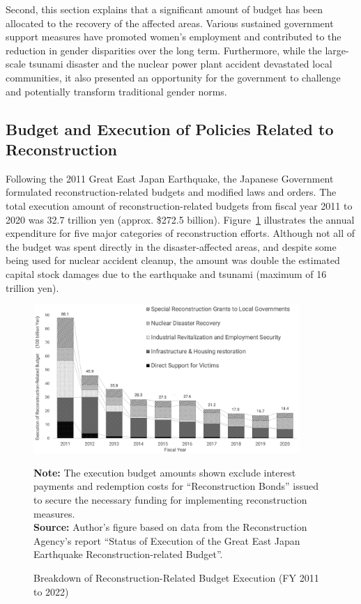 \documentclass[a4paper,12pt]{article}
\begin{document}
Second, this section explains that a significant amount of budget has been allocated to the recovery of the affected areas. Various sustained government support measures have promoted women's employment and contributed to the reduction in gender disparities over the long term. Furthermore, while the large-scale tsunami disaster and the nuclear power plant accident devastated local communities, it also presented an opportunity for the government to challenge and potentially transform traditional gender norms.


\subsection{Budget and Execution of Policies Related to Reconstruction}

Following the 2011 Great East Japan Earthquake, the Japanese Government formulated reconstruction-related budgets and modified laws and orders. The total execution amount of reconstruction-related budgets from fiscal year 2011 to 2020 was 32.7 trillion yen (approx. \$272.5 billion). Figure~\ref{fig:Budget} illustrates the annual expenditure for five major categories of reconstruction efforts. Although not all of the budget was spent directly in the disaster-affected areas, and despite some being used for nuclear accident cleanup, the amount was double the estimated capital stock damages due to the earthquake and tsunami (maximum of 16 trillion yen).

\begin{figure}[htbp]
    \centering
    \includegraphics[width=0.9\textwidth]{Reconstruction-Related Budget.jpeg}
    \footnotesize
    \begin{minipage}{0.9\textwidth}
        \textbf{Note:} The execution budget amounts shown exclude interest payments and redemption costs for ``Reconstruction Bonds'' issued to secure the necessary funding for implementing reconstruction measures.\\
        \textbf{Source:} Author's figure based on data from the Reconstruction Agency's report ``Status of Execution of the Great East Japan Earthquake Reconstruction-related Budget''.
    \end{minipage}
    \caption{Breakdown of Reconstruction-Related Budget Execution (FY 2011 to 2022)}
    \label{fig:Budget}
\end{figure}
\end{document}

